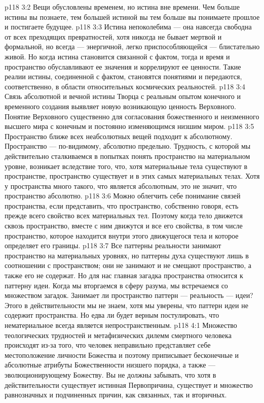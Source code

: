 \vs p118 3:2 \pc Вещи обусловлены временем, но истина вне времени. Чем больше истины вы познаете, тем большей истиной вы  тем больше вы понимаете прошлое и постигаете будущее.
\vs p118 3:3 Истина непоколебима --- она навсегда свободна от всех преходящих превратностей, хотя никогда не бывает мертвой и формальной, но всегда --- энергичной, легко приспособляющейся --- блистательно живой. Но когда истина становится связанной с фактом, тогда и время и пространство обуславливают ее значения и коррелируют ее ценности. Такие реалии истины, соединенной с фактом, становятся понятиями и передаются, соответственно, в области относительных космических реальностей.
\vs p118 3:4 Связь абсолютной и вечной истины Творца с реальным опытом конечного и временного создания выявляет новую возникающую ценность Верховного. Понятие Верховного существенно для согласования божественного и неизменного высшего мира с конечным и постоянно изменяющимся низшим миром.
\vs p118 3:5 \pc Пространство ближе всех неабсолютных вещей подходит к абсолютному. Пространство --- по\hyp{}видимому, абсолютно предельно. Трудность, с которой мы действительно сталкиваемся в попытках понять пространство на материальном уровне, возникает вследствие того, что, хотя материальные тела существуют в пространстве, пространство существует и в этих самых материальных телах. Хотя у пространства много такого, что является абсолютным, это не значит, что пространство абсолютно.
\vs p118 3:6 Можно облегчить себе понимание связей пространства, если представить, что пространство, собственно говоря, есть прежде всего свойство всех материальных тел. Поэтому когда тело движется сквозь пространство, вместе с ним движутся и все его свойства, в том числе пространство, которое находится внутри этого движущегося тела и которое определяет его границы.
\vs p118 3:7 Все паттерны реальности занимают пространство на материальных уровнях, но паттерны духа существуют лишь в соотношении с пространством; они не занимают и не смещают пространство, а также его не содержат. Но для нас главная загадка пространства относится к паттерну идеи. Когда мы вторгаемся в сферу разума, мы встречаемся со множеством загадок. Занимает ли пространство паттерн --- реальность --- идеи? Этого в действительности мы не знаем, хотя мы уверены, что паттерн идеи не содержит пространства. Но едва ли будет верным постулировать, что нематериальное всегда является непространственным.
\vs p118 4:1 Множество теологических трудностей и метафизических дилемм смертного человека происходят из\hyp{}за того, что человек неправильно представляет себе местоположение личности Божества и поэтому приписывает бесконечные и абсолютные атрибуты Божественности низшего порядка, а также --- эволюционирующему Божеству. Вы не должны забывать, что хотя в действительности существует истинная Первопричина, существует и множество равнозначных и подчиненных причин, как связанных, так и вторичных.
